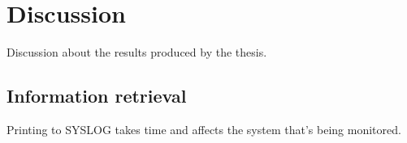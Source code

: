\chapter{Discussion}
Discussion about the results produced by the thesis.

\section{Information retrieval}
Printing to SYSLOG takes time and affects the system that's being monitored.